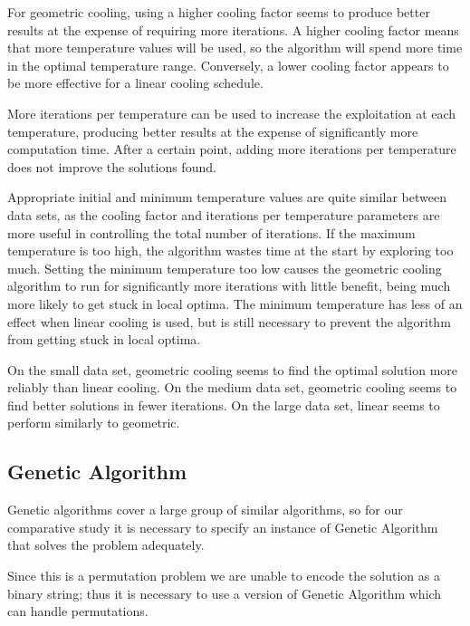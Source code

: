 \documentclass[a4paper]{article}
\begin{document}
For geometric cooling, using a higher cooling factor seems to produce better results at the expense of requiring more iterations. A higher cooling factor means that more temperature values will be used, so the algorithm will spend more time in the optimal temperature range. Conversely, a lower cooling factor appears to be more effective for a linear cooling schedule.

More iterations per temperature can be used to increase the exploitation at each temperature, producing better results at the expense of significantly more computation time. After a certain point, adding more iterations per temperature does not improve the solutions found.

Appropriate initial and minimum temperature values are quite similar between data sets, as the cooling factor and iterations per temperature parameters are more useful in controlling the total number of iterations. If the maximum temperature is too high, the algorithm wastes time at the start by exploring too much. Setting the minimum temperature too low causes the geometric cooling algorithm to run for significantly more iterations with little benefit, being much more likely to get stuck in local optima. The minimum temperature has less of an effect when linear cooling is used, but is still necessary to prevent the algorithm from getting stuck in local optima.

On the small data set, geometric cooling seems to find the optimal solution more reliably than linear cooling. On the medium data set, geometric cooling seems to find better solutions in fewer iterations. On the large data set, linear seems to perform similarly to geometric.


\subsection{Genetic Algorithm} %

Genetic algorithms cover a large group of similar algorithms, so for our comparative study it is necessary to specify an instance of Genetic Algorithm that solves the problem adequately.

Since this is a permutation problem we are unable to encode the solution as a binary string; thus it is necessary to use a version of Genetic Algorithm which can handle permutations.
\end{document}
